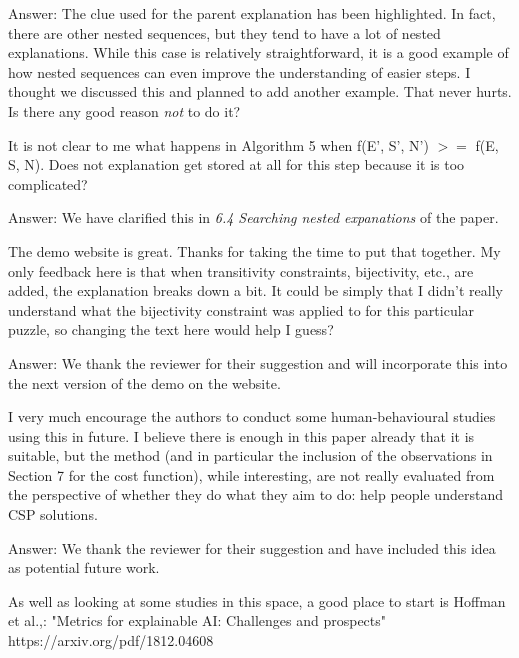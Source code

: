 \documentclass{article}
\newcommand\comment[1]{\marginpar{\tiny #1}}
\renewcommand\comment[1]{#1}
\newcommand{\emilio}[1]{{\comment{Answer: \color{red}#1}}}
\newcommand{\bart}[1]{{\comment{\color{green}#1}}}
\begin{document}
\emilio{The clue used for the parent explanation has been highlighted. In fact, there are other nested sequences, but they tend to have a lot of nested explanations. While this case is relatively straightforward, it is a good example of how nested sequences can even improve the understanding of easier steps.}
\bart{I thought we discussed this and planned to add another example. That never hurts. Is there any good reason \emph{not} to do it?}

\begin{quoteit}
It is not clear to me what happens in Algorithm 5 when f(E', S', N') $>=$ f(E, S, N). Does not explanation get stored at all for this step because it is too complicated? 
\end{quoteit}

\emilio{We have clarified this in \emph{6.4 Searching nested expanations} of the paper.}

\begin{quoteit}
The demo website is great. Thanks for taking the time to put that together. My only feedback here is that when transitivity constraints, bijectivity, etc., are added, the explanation breaks down a bit. It could be simply that I didn't really  understand what the bijectivity constraint was applied to for this particular puzzle, so changing the text here would help I guess?
\end{quoteit}

\emilio{We thank the reviewer for their suggestion and will incorporate this into the next version of the demo on the website.}

\begin{quoteit}
I very much encourage the authors to conduct some human-behavioural studies using this in future. I believe there is enough in this paper already that it is suitable, but the method (and in particular the inclusion of the observations in Section 7 for the cost function), while interesting, are not really evaluated from the perspective of whether they do what they aim to do: help people understand CSP solutions. 
\end{quoteit}

\emilio{We thank the reviewer for their suggestion and have included this idea as potential future work.}


\begin{quoteit}
As well as looking at some studies in this space, a good place to start is Hoffman et al.,: "Metrics for explainable AI: Challenges and prospects" https://arxiv.org/pdf/1812.04608 
\end{quoteit}
\end{document}
